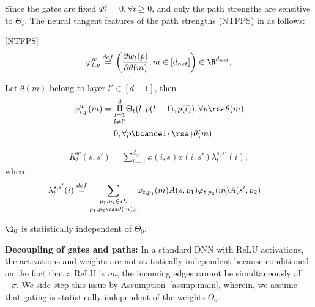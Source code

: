 Since the gates are fixed $\Psi^a_t=0,\forall t\geq 0$, and only the path strengths are sensitive to $\Theta_t$. The neural tangent features of the path strengths (NTFPS) in  as follows:

\begin{definition}\label{def:ntfps}[NTFPS]
\begin{align}
\varphi^w_{t,p}\stackrel{def}{=}\left(\frac{\partial w_{t}(p)}{\partial \theta(m)},m\in[d_{net}]\right)\in \R^{d_{net}},
\end{align}
\end{definition}
\begin{remark}
Let $\theta(m)$ belong to layer $l'\in [d-1]$, then 
\begin{align*}
\varphi^w_{t,p}(m)&=\underset{l\neq l'}{\underset{l=1}{\overset{d}{\Pi}}} \Theta_t(l,p(l-1),p(l)), \forall p\rsa\theta(m)\\
&=0, \forall p\bcancel{\rsa}\theta(m)
\end{align*}
\end{remark}

\begin{remark}\label{rm:basicgram}
\begin{align*}
{K^w_t(s,s')}=\sum_{i=1}^{d_{in}} x(i,s)x(i,s') \lambda^{s,s'}_t(i),
\end{align*}
where
\begin{align*}
&\lambda^{s,s'}_t(i)\stackrel{def}=\underset{p_1,p_2\rsa\theta(m),i}{\sum_{p_1,p_2\in P:}}  \varphi_{t,p_1}(m)A(s,p_1)  \varphi_{t,p_2}(m) A(s',p_2)
\end{align*}

\end{remark}

\begin{assumption}\label{assmp:mainone}
$\G_0$ is statistically independent of $\Theta_0$.
\end{assumption}
\textbf{Decoupling of gates and paths:} In a standard DNN with ReLU activations, the activations and weights are not statistically independent because conditioned on the fact that a ReLU is \emph{on}, the incoming edges cannot be simultaneously all $-\sigma$. 
We side step this issue by Assumption~\ref{assmp:main}, wherein, we assume that  gating is statistically independent of the weights $\Theta_0$. 


